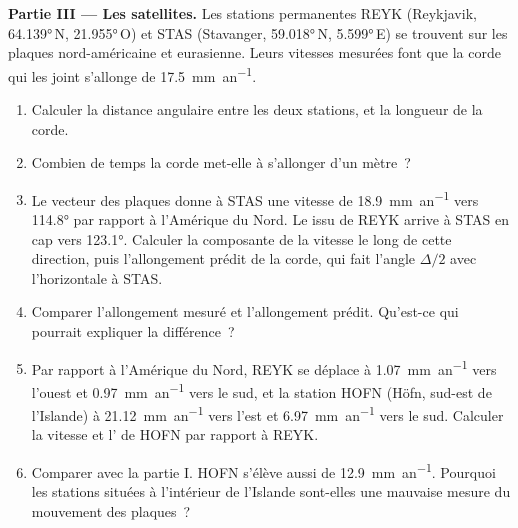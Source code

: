 \begin{problem}
\noindent\textbf{Partie III --- Les satellites.}
Les stations permanentes REYK (Reykjavik, \ang{64.139}\,N, \ang{21.955}\,O) et
STAS (Stavanger, \ang{59.018}\,N, \ang{5.599}\,E) se trouvent sur les plaques nord-américaine et
eurasienne. Leurs vitesses mesurées font que la corde qui les joint s'allonge
de \qty{17.5}{mm.an^{-1}}.
\begin{enumerate}[resume]
  \item Calculer la distance angulaire entre les deux stations, et la longueur
        de la corde.
  \item Combien de temps la corde met-elle à s'allonger d'un mètre~?
  \item Le vecteur des plaques donne à STAS une vitesse de \qty{18.9}{mm.an^{-1}} vers
        \ang{114.8} par rapport à l'Amérique du Nord. Le  issu de REYK
        arrive à STAS en cap vers \ang{123.1}. Calculer la composante de
        la vitesse le long de cette direction, puis l'allongement prédit de
        la corde, qui fait l'angle $\Delta/2$ avec l'horizontale à STAS.
  \item Comparer l'allongement mesuré et l'allongement prédit. Qu'est-ce qui pourrait expliquer
        la différence~?
  \item Par rapport à l'Amérique du Nord, REYK se déplace à \qty{1.07}{mm.an^{-1}} vers
        l'ouest et \qty{0.97}{mm.an^{-1}} vers le sud, et la station HOFN (Höfn,
        sud-est de l'Islande) à \qty{21.12}{mm.an^{-1}} vers l'est et
        \qty{6.97}{mm.an^{-1}} vers le sud. Calculer la vitesse et l' de HOFN
        par rapport à REYK.
  \item Comparer avec la partie I. HOFN s'élève aussi de \qty{12.9}{mm.an^{-1}}. Pourquoi les
        stations situées à l'intérieur de l'Islande sont-elles une mauvaise mesure du mouvement des plaques~?
\end{enumerate}


\end{problem}
